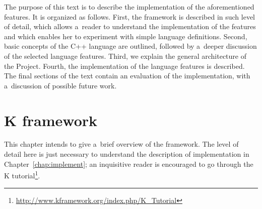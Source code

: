 \documentclass[nolot,nolof,nocover,printed]{fithesis3}
\newcommand{\Project}{Project\xspace}
\begin{document}
 

The purpose of this text is to describe the implementation of the aforementioned features. It is organized as follows. First, the \K framework is described in such level of detail, which allows a~reader to understand the implementation of the features and which enables her to experiment with simple language definitions. Second, basic concepts of the C++ language are outlined, followed by a~deeper discussion of the selected language features. Third, we explain the general architecture of the \Project. Fourth, the implementation of the language features is described. The final sections of the text contain an evaluation of the implementation, with a~discussion of possible future work.





\chapter{K framework} \label{chap:k}

This chapter intends to give a~brief overview of the \K framework.
The level of detail here is just necessary to understand the description of implementation in Chapter~\ref{chap:implement}; an inquisitive reader is encouraged to go through the K tutorial\footnote{\url{http://www.kframework.org/index.php/K_Tutorial}}.

%


\end{document}
